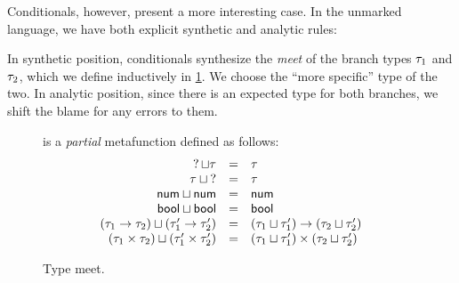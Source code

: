 Conditionals, however, present a more interesting case. In the unmarked language, we have both explicit
synthetic and analytic rules:
%
\begin{mathpar}

\end{mathpar}
%
In synthetic position, conditionals synthesize the \emph{meet} of the branch types $\TMV_1$ and
$\TMV_2$, which we define inductively in \cref{fig:calculus-type-meet}. We choose the ``more
specific'' type of the two. In analytic position, since
there is an expected type for both branches, we shift the blame for any errors to them.

\newcommand{\meetsTo}[3]{\ensuremath{\TMeet{#1}{#2} & = & #3}}
\begin{figure}[htbp]
  \raggedright
   is a \emph{partial} metafunction defined as follows:
  \[\begin{array}{rcl}
    \meetsTo{\TUnknown}{\TMV}{\TMV} \\
    \meetsTo{\TMV}{\TUnknown}{\TMV} \\
    \meetsTo{\TNum}{\TNum}{\TNum} \\
    \meetsTo{\TBool}{\TBool}{\TBool} \\
    \meetsTo{(\TArrow{\TMV_1}{\TMV_2})}{(\TArrow{\TMV_1'}{\TMV_2'})}{\TArrow{(\TMeet{\TMV_1}{\TMV_1'})}{(\TMeet{\TMV_2}{\TMV_2'})}} \\
    \meetsTo{(\TProd{\TMV_1}{\TMV_2})}{(\TProd{\TMV_1'}{\TMV_2'})}{\TProd{(\TMeet{\TMV_1}{\TMV_1'})}{(\TMeet{\TMV_2}{\TMV_2'})}}
  \end{array}\]
  \vspace{-10px}
  \caption{Type meet.}
  \label{fig:calculus-type-meet}
\end{figure}

